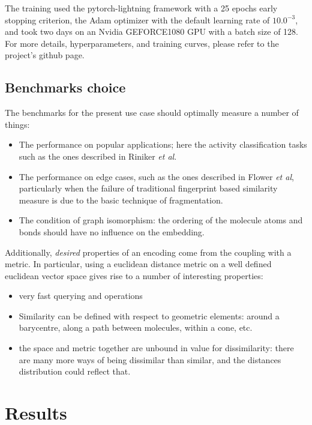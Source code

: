 \documentclass[doublespacing]{bmcart}
\begin{document}
 The training used the pytorch-lightning framework \cite{falcon2019pytorch} with a 25 epochs early stopping criterion, the Adam optimizer with the default learning rate of $10.0^{-3}$, and took two days on an Nvidia GEFORCE1080 GPU with a batch size of 128. For more details, hyperparameters, and training curves, please refer to the project's github page.
\subsection*{Benchmarks choice}
The benchmarks for the present use case should optimally measure a number of things:
\begin{itemize}
\item The performance on popular applications; here the activity classification tasks such as the ones described in Riniker \textit{et al}\cite{riniker2013open}.
\item The performance on edge cases, such as the ones described in Flower \textit{et al}\cite{flower1998properties}, particularly when the failure of traditional fingerprint based similarity measure is due to the basic technique of fragmentation.
\item The condition of graph isomorphism: the ordering of the molecule atoms and bonds should have no influence on the embedding.
\end{itemize}
Additionally, \textit{desired} properties of an encoding come from the coupling with a metric. In particular, using a euclidean distance metric on a well defined euclidean vector space gives rise to a number of interesting properties:
\begin{itemize}
\item very fast querying and operations
\item Similarity can be defined with respect to geometric elements: around a barycentre, along a path between molecules, within a cone, etc.
\item the space and metric together are unbound in value for dissimilarity: there are many more ways of being dissimilar than similar, and the distances distribution could reflect that.
\end{itemize}
\section*{Results}
\end{document}
